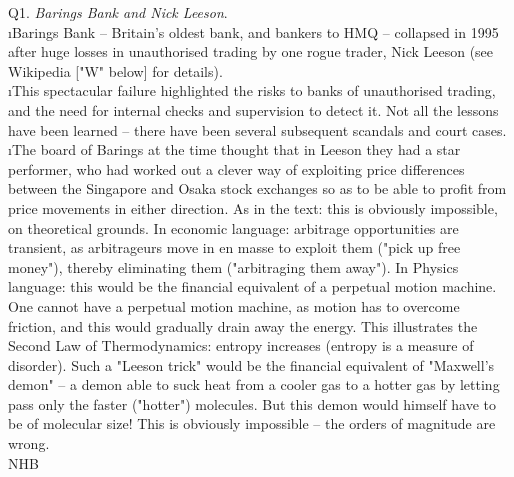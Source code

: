 \documentclass[12pt]{article}
\begin{document}
\ni Q1.  {\it Barings Bank and Nick Leeson}.  \\
\i Barings Bank -- Britain's oldest bank, and bankers to HMQ -- collapsed in 1995 after huge losses in unauthorised trading by one rogue trader, Nick Leeson (see Wikipedia ["W" below] for details). \\
\i This spectacular failure highlighted the risks to banks of unauthorised trading, and the need for internal checks and supervision to detect it.  Not all the lessons have been learned -- there have been several subsequent scandals and court cases. \\
\i The board of Barings at the time thought that in Leeson they had a star performer, who had worked out a clever way of exploiting price differences between the Singapore and Osaka stock exchanges so as to be able to profit from price movements in either direction.  As in the text: this is obviously impossible, on theoretical grounds.  In economic language: arbitrage opportunities are transient, as arbitrageurs move in en masse to exploit them ("pick up free money"), thereby eliminating them ("arbitraging them away").  In Physics language: this would be the financial equivalent of a perpetual motion machine.  One cannot have a perpetual motion machine, as motion has to overcome friction, and this would gradually drain away the energy.  This illustrates the Second Law of Thermodynamics: entropy increases (entropy is a measure of disorder).  Such a "Leeson trick" would be the financial equivalent of "Maxwell's demon" -- a demon able to suck heat from a cooler gas to a hotter gas by letting pass only the faster ("hotter") molecules.  But this demon would himself have to be of molecular size!  This is obviously impossible -- the orders of magnitude are wrong. \\

\hfil NHB \break
\end{document}
